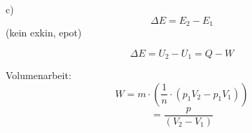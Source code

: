 c) 
\[
\Delta E = E_2 - E_1
\]
(kein exkin, epot)

\[
\Delta E = U_2 - U_1 = Q - W
\]

Volumenarbeit:
\[
W = m \cdot \left( \frac{1}{n} \cdot (p_1 V_2 - p_1 V_1) \right)
\]
\[
= \frac{p}{(V_2 - V_1)}
\]